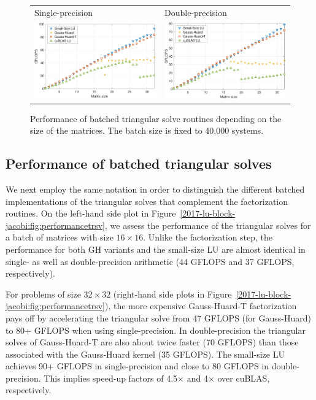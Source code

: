\begin{figure}
\begin{center}
\begin{tabular}{ll}
\hline
Single-precision & Double-precision\\
\includegraphics[width=.45\columnwidth]{plots/trsv_incsize_single.pdf}
&
\includegraphics[width=.45\columnwidth]{plots/trsv_incsize_double.pdf}\\
\end{tabular}
\end{center}
\caption{%
Performance of batched triangular solve routines depending on the size of the matrices.
The batch size is fixed to 40,000 systems.
}
\label{2017-lu-block-jacobi:fig:performancetrsvincsize}
\end{figure}



\subsection{Performance of batched triangular solves}
We next employ the same notation in order to distinguish the different batched implementations of
the triangular solves that complement the factorization routines.
On the left-hand side plot in Figure~\ref{2017-lu-block-jacobi:fig:performancetrsv}, we assess the performance
of the triangular solves for a batch of matrices with size $16\times16$.
Unlike the factorization step, the performance for both GH variants and
the small-size LU are almost identical in single- as well as double-precision arithmetic
(44 GFLOPS and 37 GFLOPS, respectively).


For problems of size $32\times32$ (right-hand side plots in Figure~\ref{2017-lu-block-jacobi:fig:performancetrsv}), 
the more expensive Gauss-Huard-T factorization pays off
by accelerating the triangular solve from 47 GFLOPS (for Gauss-Huard) to 80+ GFLOPS
when using single-precision. In  double-precision the triangular solves of 
Gauss-Huard-T are also about twice faster (70 GFLOPS) than those associated with the
Gauss-Huard kernel (35 GFLOPS).
The small-size LU achieves 90+ GFLOPS in single-precision and close to 80 GFLOPS in double-precision.
This implies speed-up factors of 4.5$\times$ and 4$\times$ over cuBLAS, respectively.


